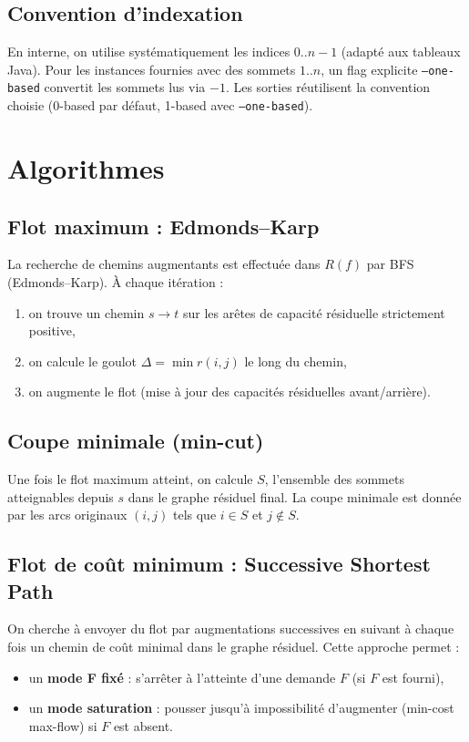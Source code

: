\documentclass{rapport}
\begin{document}
\subsection{Convention d'indexation}
En interne, on utilise systématiquement les indices $0..n-1$ (adapté aux tableaux Java). Pour les instances fournies avec des sommets $1..n$, un flag explicite \texttt{--one-based} convertit les sommets lus via $-1$. Les sorties réutilisent la convention choisie (0-based par défaut, 1-based avec \texttt{--one-based}).

\section{Algorithmes}\label{sec:algos}
\subsection{Flot maximum : Edmonds--Karp}
La recherche de chemins augmentants est effectuée dans $R(f)$ par BFS (Edmonds--Karp). À chaque itération :
\begin{enumerate}
    \item on trouve un chemin $s\to t$ sur les arêtes de capacité résiduelle strictement positive,
    \item on calcule le goulot $\Delta = \min r(i,j)$ le long du chemin,
    \item on augmente le flot (mise à jour des capacités résiduelles avant/arrière).
\end{enumerate}

\subsection{Coupe minimale (min-cut)}
Une fois le flot maximum atteint, on calcule $S$, l'ensemble des sommets atteignables depuis $s$ dans le graphe résiduel final. La coupe minimale est donnée par les arcs originaux $(i,j)$ tels que $i\in S$ et $j\notin S$.

\subsection{Flot de coût minimum : Successive Shortest Path}
On cherche à envoyer du flot par augmentations successives en suivant à chaque fois un chemin de coût minimal dans le graphe résiduel.
Cette approche permet :
\begin{itemize}
    \item un \textbf{mode F fixé} : s'arrêter à l'atteinte d'une demande $F$ (si $F$ est fourni),
    \item un \textbf{mode saturation} : pousser jusqu'à impossibilité d'augmenter (min-cost max-flow) si $F$ est absent.
\end{itemize}
\end{document}
